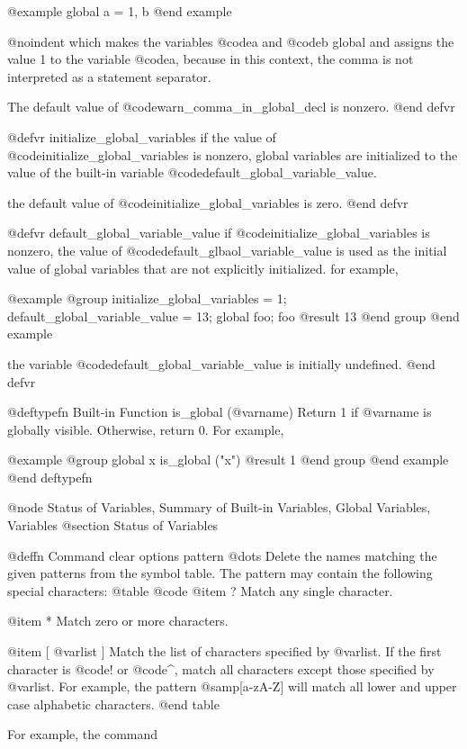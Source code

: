 @example
global a = 1, b
@end example

@noindent
which makes the variables @code{a} and @code{b} global and assigns the
value 1 to the variable @code{a}, because in this context, the comma is
not interpreted as a statement separator.

The default value of @code{warn_comma_in_global_decl} is nonzero.
@end defvr

@defvr initialize_global_variables
if the value of @code{initialize_global_variables} is nonzero, global
variables are initialized to the value of the built-in variable
@code{default_global_variable_value}.

the default value of @code{initialize_global_variables} is zero.
@end defvr

@defvr default_global_variable_value
if @code{initialize_global_variables} is nonzero, the value of
@code{default_glbaol_variable_value} is used as the initial value of
global variables that are not explicitly initialized.  for example,

@example
@group
initialize_global_variables = 1;
default_global_variable_value = 13;
global foo;
foo
     @result{} 13
@end group
@end example

the variable @code{default_global_variable_value} is initially undefined.
@end defvr

@deftypefn {Built-in Function} {} is_global (@var{name})
Return 1 if @var{name} is globally visible.  Otherwise, return 0.  For
example,

@example
@group
global x
is_global ("x")
     @result{} 1
@end group
@end example
@end deftypefn

@node Status of Variables, Summary of Built-in Variables, Global Variables, Variables
@section Status of Variables

@deffn {Command} clear options pattern @dots{}
Delete the names matching the given patterns from the symbol table.  The
pattern may contain the following special characters:
@table @code
@item ?
Match any single character.

@item *
Match zero or more characters.

@item [ @var{list} ]
Match the list of characters specified by @var{list}.  If the first
character is @code{!} or @code{^}, match all characters except those
specified by @var{list}.  For example, the pattern @samp{[a-zA-Z]} will
match all lower and upper case alphabetic characters. 
@end table

For example, the command

